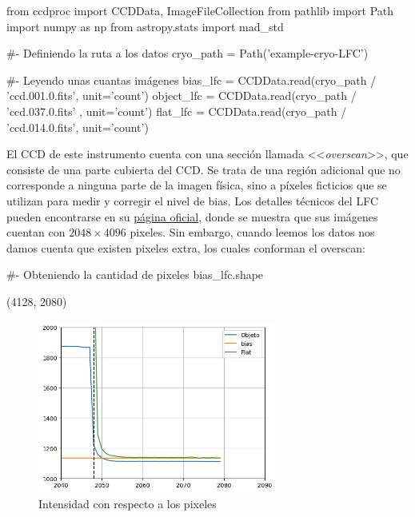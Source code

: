 \begin{pyin}
from ccdproc import CCDData, ImageFileCollection
from pathlib import Path
import numpy as np
from astropy.stats import mad_std
\end{pyin}

\begin{pyin}[]
#- Definiendo la ruta a los datos
cryo_path = Path('example-cryo-LFC')

#- Leyendo unas cuantas imágenes
bias_lfc   = CCDData.read(cryo_path / 'ccd.001.0.fits', unit='count')
object_lfc = CCDData.read(cryo_path / 'ccd.037.0.fits' , unit='count')
flat_lfc   = CCDData.read(cryo_path / 'ccd.014.0.fits', unit='count') 
\end{pyin}

El CCD de este instrumento cuenta con una sección llamada <<\emph{overscan}>>, que consiste de una parte cubierta del CCD. Se trata de una región adicional que no corresponde a ninguna parte de la imagen física, sino a píxeles ficticios que se utilizan para medir y corregir el nivel de bias. Los detalles técnicos del LFC pueden encontrarse en su \href{https://sites.astro.caltech.edu/palomar/observer/200inchResources/lfcspecs.html}{página oficial}, donde se muestra que sus imágenes cuentan con $ 2048 \times 4096 $ pixeles. Sin embargo, cuando leemos los datos nos damos cuenta que existen pixeles extra, los cuales conforman el overscan:

\begin{pyin}[]
#- Obteniendo la cantidad de pixeles
bias_lfc.shape
\end{pyin}
\begin{pyout}
(4128, 2080)
\end{pyout}

\begin{figure}[htb]
  \centering
				\includegraphics[width=0.7\textwidth]{figures/overscan.png}
				\caption{Intensidad con respecto a los pixeles}
				\label{fig:overscan} 
\end{figure}


